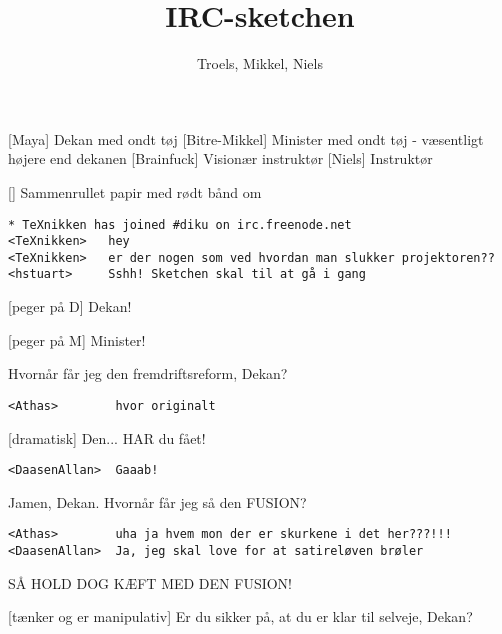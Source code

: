 \documentclass[a4paper,11pt]{article}
\title{IRC-sketchen}
\author{Troels, Mikkel, Niels}
\begin{document}
\maketitle

\begin{roles}
[Maya] Dekan med ondt tøj
[Bitre-Mikkel] Minister med ondt tøj - væsentligt højere end dekanen
[Brainfuck] Visionær instruktør
[Niels] Instruktør
\end{roles}

\begin{props}
[] Sammenrullet papir med rødt bånd om
\end{props}

\begin{sketch}

\begin{verbatim}
* TeXnikken has joined #diku on irc.freenode.net
<TeXnikken>   hey
<TeXnikken>   er der nogen som ved hvordan man slukker projektoren??
<hstuart>     Sshh! Sketchen skal til at gå i gang
\end{verbatim}



[peger på D] Dekan!

[peger på M] Minister!

 Hvornår får jeg den fremdriftsreform, Dekan?

\begin{verbatim}
<Athas>        hvor originalt
\end{verbatim}

[dramatisk] Den... HAR du fået!

\begin{verbatim}
<DaasenAllan>  Gaaab!
\end{verbatim}

 Jamen, Dekan. Hvornår får jeg så den FUSION?

\begin{verbatim}
<Athas>        uha ja hvem mon der er skurkene i det her???!!!
<DaasenAllan>  Ja, jeg skal love for at satireløven brøler
\end{verbatim}

 SÅ HOLD DOG KÆFT MED DEN FUSION!

[tænker og er manipulativ] Er du sikker på, at du er klar til selveje, Dekan?


\end{sketch}
\end{document}
